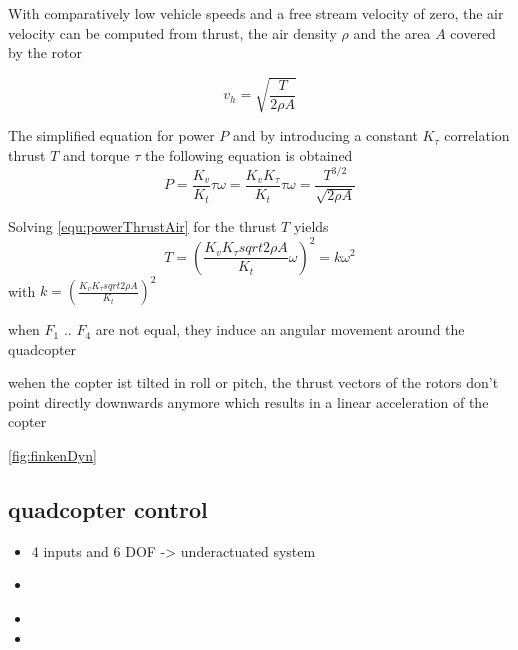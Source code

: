 With comparatively low vehicle speeds and a free stream velocity of zero, the air velocity can be computed from thrust, the air density $\rho$ and the area $A$ covered by the rotor

\begin{equation}
v_h = \sqrt{\frac{T}{2\rho A}}
\end{equation}

The simplified equation for power $P$ and by introducing a constant $K_\tau$ correlation thrust $T$ and torque $\tau$ the following equation is obtained
\begin{equation}
P = \frac{K_v}{K_t} \tau \omega  = \frac{K_v K_\tau}{K_t} \tau \omega = \frac{T^{3/2}}{\sqrt{2\rho A}}
\label{equ:powerThrustAir}
\end{equation}

Solving \ref{equ:powerThrustAir} for the thrust $T$ yields 
\begin{equation}
T = (\frac{K_v K_\tau sqrt{2 \rho A}}{K_t}\omega)^2 = k\omega^2
\end{equation}
with $k = (\frac{K_v K_\tau sqrt{2 \rho A}}{K_t})^2$

\par{when $F_1$ .. $F_4$ are not equal, they induce an angular movement around the quadcopter}
\par{wehen the copter ist tilted in roll or pitch, the thrust vectors of the rotors don't point directly downwards anymore which results in a linear acceleration of the copter}
\par{\ref{fig:finkenDyn}  }
\subsection{quadcopter control}


\begin{itemize}
\item{4 inputs and 6 DOF -> underactuated system}
\item{}
\end{itemize}


\begin{itemize}
\item{}
\item{}
\end{itemize}


